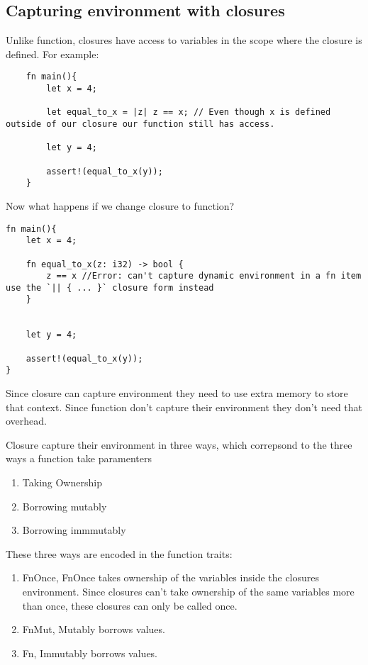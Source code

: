 \subsection{Capturing environment with closures}

Unlike function, closures have access to variables in the scope where the closure is defined. For example:\begin{lstlisting}
    fn main(){
        let x = 4;

        let equal_to_x = |z| z == x; // Even though x is defined outside of our closure our function still has access.

        let y = 4;

        assert!(equal_to_x(y));
    }
\end{lstlisting}

Now what happens if we change closure to function?

\begin{lstlisting}
fn main(){
    let x = 4;

    fn equal_to_x(z: i32) -> bool {
        z == x //Error: can't capture dynamic environment in a fn item use the `|| { ... }` closure form instead
    }


    let y = 4;

    assert!(equal_to_x(y));
}
\end{lstlisting}

Since closure can capture environment they need to use extra memory to store that context. Since function don't capture their environment they don't need that overhead.

Closure capture their environment in three ways, which correpsond to the three ways a function take paramenters\begin{enumerate}
    \item Taking Ownership
    \item Borrowing mutably
    \item Borrowing immmutably 
\end{enumerate}

These three ways are encoded in the function traits: \begin{enumerate}
    \item FnOnce, FnOnce takes ownership of the variables inside the closures environment. Since closures can't take ownership of the same variables more than once, these closures can only be called once.
    \item FnMut, Mutably borrows values.
    \item Fn, Immutably borrows values.
\end{enumerate}

